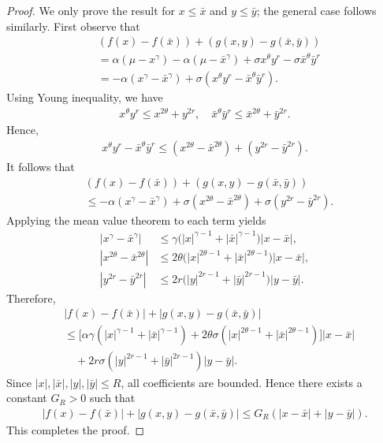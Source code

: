 \documentclass[11pt]{article}
\begin{document}
\begin{proof}
We only prove the result for $x \le \bar{x}$ and $y \le \bar{y}$; the general case follows similarly. First observe that
\begin{align*}
&(f(x)-f(\bar{x})) +(g(x,y)-g(\bar{x},\bar{y})) \\
&= \alpha(\mu - x^{\gamma}) - \alpha(\mu - \bar{x}^{\gamma})
  + \sigma x^{\theta}y^r - \sigma \bar{x}^{\theta}\bar{y}^r \\
&= -\alpha (x^{\gamma} - \bar{x}^{\gamma})
   + \sigma (x^{\theta}y^r - \bar{x}^{\theta}\bar{y}^r).
\end{align*}
Using Young inequality, we have
\begin{align*}
x^{\theta}y^r \le x^{2\theta} + y^{2r}, 
\quad
\bar{x}^{\theta}\bar{y}^r \le \bar{x}^{2\theta} + \bar{y}^{2r}.
\end{align*}
Hence,
\begin{align*}
x^{\theta}y^r - \bar{x}^{\theta}\bar{y}^r
\le (x^{2\theta} - \bar{x}^{2\theta}) + (y^{2r} - \bar{y}^{2r}).
\end{align*}
It follows that
\begin{align*}
&(f(x)-f(\bar{x}))+(g(x,y)-g(\bar{x},\bar{y})) \\
&\le -\alpha (x^{\gamma} - \bar{x}^{\gamma})
+ \sigma (x^{2\theta} - \bar{x}^{2\theta})
+ \sigma (y^{2r} - \bar{y}^{2r}).
\end{align*}
Applying the mean value theorem to each term yields
\begin{align*}
|x^{\gamma} - \bar{x}^{\gamma}|
&\le \gamma \big(|x|^{\gamma-1} + |\bar{x}|^{\gamma-1}\big) |x-\bar{x}|, \\
|x^{2\theta} - \bar{x}^{2\theta}|
&\le 2\theta \big(|x|^{2\theta-1} + |\bar{x}|^{2\theta-1}\big) |x-\bar{x}|, \\
|y^{2r} - \bar{y}^{2r}|
&\le 2r \big(|y|^{2r-1} + |\bar{y}|^{2r-1}\big) |y-\bar{y}|.
\end{align*}
Therefore,
\begin{align*}
&| f(x)-f(\bar{x}) | + | g(x,y)-g(\bar{x},\bar{y}) | \\
&\le \Big[\alpha \gamma (|x|^{\gamma-1} + |\bar{x}|^{\gamma-1})
+ 2\theta\sigma (|x|^{2\theta-1} + |\bar{x}|^{2\theta-1}) \Big] |x-\bar{x}| \\
&\quad + 2r\sigma (|y|^{2r-1} + |\bar{y}|^{2r-1}) |y-\bar{y}|.
\end{align*}
Since $|x|,|\bar{x}|,|y|,|\bar{y}| \le R$, all coefficients are bounded. Hence there exists a constant $G_R>0$ such that
\begin{align*}
| f(x)-f(\bar{x}) | + | g(x,y)-g(\bar{x},\bar{y}) |
\le G_R (|x-\bar{x}| + |y-\bar{y}|).
\end{align*}
This completes the proof.
\end{proof}
\end{document}
